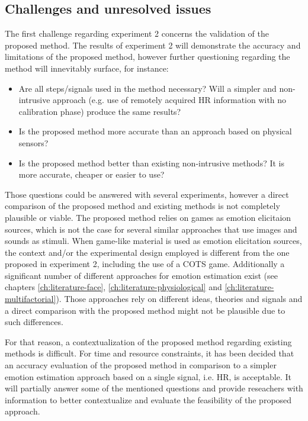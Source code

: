 \subsection{Challenges and unresolved issues}
\label{experiment2-challenges}

The first challenge regarding experiment 2 concerns the validation of the proposed method. The results of experiment 2 will demonstrate the accuracy and limitations of the proposed method, however further questioning regarding the method will innevitably surface, for instance:

\begin{itemize}
  \item Are all steps/signals used in the method necessary? Will a simpler and non-intrusive approach (e.g. use of remotely acquired HR information with no calibration phase) produce the same results?
  \item Is the proposed method more accurate than an approach based on physical sensors?
  \item Is the proposed method better than existing non-intrusive methods? It is more accurate, cheaper or easier to use?
\end{itemize}

Those questions could be answered with several experiments, however a direct comparison of the proposed method and existing methods is not completely plausible or viable. The proposed method relies on games as emotion elicitaion sources, which is not the case for several similar approaches that use images and sounds as stimuli. When game-like material is used as emotion elicitation sources, the context and/or the experimental design employed is different from the one proposed in experiment 2, including the use of a COTS game. Additionally a significant number of different approaches for emotion estimation exist (see chapters \ref{ch:literature-face}, \ref{ch:literature-physiological} and \ref{ch:literature-multifactorial}). Those approaches rely on different ideas, theories and signals and a direct comparison with the proposed method might not be plausible due to such differences.

For that reason, a contextualization of the proposed method regarding existing methods is difficult. For time and resource constraints, it has been decided that an accuracy evaluation of the proposed method in comparison to a simpler emotion estimation approach based on a single signal, i.e. HR, is acceptable. It will partially answer some of the mentioned questions and provide reseachers with information to better contextualize and evaluate the feasibility of the proposed approach.

